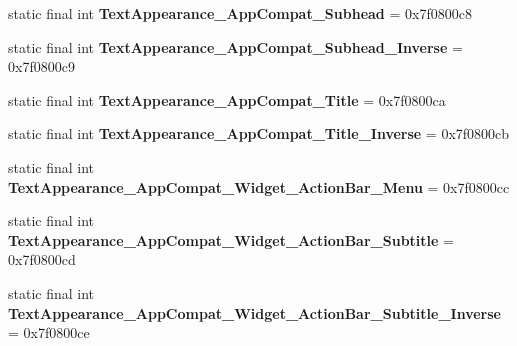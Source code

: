 \begin{DoxyCompactItemize}
\item 
\hypertarget{classandroid_1_1support_1_1design_1_1_r_1_1style_aacedc78f0110a92c2c299c22125f3ef5}{}static final int {\bfseries Text\+Appearance\+\_\+\+App\+Compat\+\_\+\+Subhead} = 0x7f0800c8\label{classandroid_1_1support_1_1design_1_1_r_1_1style_aacedc78f0110a92c2c299c22125f3ef5}

\item 
\hypertarget{classandroid_1_1support_1_1design_1_1_r_1_1style_a09683f1d91752d44db1f8c8be6d4d501}{}static final int {\bfseries Text\+Appearance\+\_\+\+App\+Compat\+\_\+\+Subhead\+\_\+\+Inverse} = 0x7f0800c9\label{classandroid_1_1support_1_1design_1_1_r_1_1style_a09683f1d91752d44db1f8c8be6d4d501}

\item 
\hypertarget{classandroid_1_1support_1_1design_1_1_r_1_1style_ad05526165d88021b2df0f8928fc2ee6d}{}static final int {\bfseries Text\+Appearance\+\_\+\+App\+Compat\+\_\+\+Title} = 0x7f0800ca\label{classandroid_1_1support_1_1design_1_1_r_1_1style_ad05526165d88021b2df0f8928fc2ee6d}

\item 
\hypertarget{classandroid_1_1support_1_1design_1_1_r_1_1style_a8f9745ee1bf804c7d2e699cc8c9816d7}{}static final int {\bfseries Text\+Appearance\+\_\+\+App\+Compat\+\_\+\+Title\+\_\+\+Inverse} = 0x7f0800cb\label{classandroid_1_1support_1_1design_1_1_r_1_1style_a8f9745ee1bf804c7d2e699cc8c9816d7}

\item 
\hypertarget{classandroid_1_1support_1_1design_1_1_r_1_1style_a86a5d5ff68181041becf5bb70064877c}{}static final int {\bfseries Text\+Appearance\+\_\+\+App\+Compat\+\_\+\+Widget\+\_\+\+Action\+Bar\+\_\+\+Menu} = 0x7f0800cc\label{classandroid_1_1support_1_1design_1_1_r_1_1style_a86a5d5ff68181041becf5bb70064877c}

\item 
\hypertarget{classandroid_1_1support_1_1design_1_1_r_1_1style_a3a033a71413fc909da5a3688e40ae1d5}{}static final int {\bfseries Text\+Appearance\+\_\+\+App\+Compat\+\_\+\+Widget\+\_\+\+Action\+Bar\+\_\+\+Subtitle} = 0x7f0800cd\label{classandroid_1_1support_1_1design_1_1_r_1_1style_a3a033a71413fc909da5a3688e40ae1d5}

\item 
\hypertarget{classandroid_1_1support_1_1design_1_1_r_1_1style_aa4ba43c3f0e2503bca1b293e5f7fa921}{}static final int {\bfseries Text\+Appearance\+\_\+\+App\+Compat\+\_\+\+Widget\+\_\+\+Action\+Bar\+\_\+\+Subtitle\+\_\+\+Inverse} = 0x7f0800ce\label{classandroid_1_1support_1_1design_1_1_r_1_1style_aa4ba43c3f0e2503bca1b293e5f7fa921}


\end{DoxyCompactItemize}

